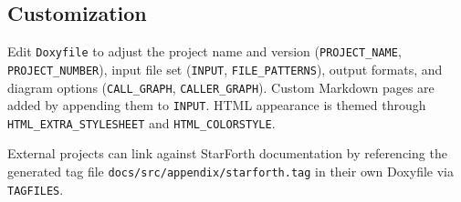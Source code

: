 \subsection{Customization}

Edit \texttt{Doxyfile} to adjust the project name and version
(\texttt{PROJECT\_NAME}, \texttt{PROJECT\_NUMBER}), input file set
(\texttt{INPUT}, \texttt{FILE\_PATTERNS}), output formats, and diagram options
(\texttt{CALL\_GRAPH}, \texttt{CALLER\_GRAPH}). Custom Markdown pages are added
by appending them to \texttt{INPUT}. HTML appearance is themed through
\texttt{HTML\_EXTRA\_STYLESHEET} and \texttt{HTML\_COLORSTYLE}.

External projects can link against StarForth documentation by referencing the
generated tag file \texttt{docs/src/appendix/starforth.tag} in their own
Doxyfile via \texttt{TAGFILES}.
